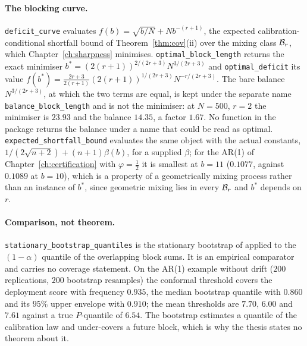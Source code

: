 \paragraph{The blocking curve.}
\texttt{deficit\_curve} evaluates $f(b)=\sqrt{b/N}+Nb^{-(r+1)}$, the expected calibration-conditional shortfall bound of Theorem~\ref{thm:cov}(ii) over the mixing class $\mathcal B_{r}$, which Chapter~\ref{ch:sharpness} minimises. \texttt{optimal\_block\_length} returns the exact minimiser $b^*=(2(r+1))^{2/(2r+3)}N^{3/(2r+3)}$ and \texttt{optimal\_deficit} its value $f(b^*)=\frac{2r+3}{2(r+1)}(2(r+1))^{1/(2r+3)}N^{-r/(2r+3)}$. The bare balance $N^{3/(2r+3)}$, at which the two terms are equal, is kept under the separate name \texttt{balance\_block\_length} and is not the minimiser: at $N=500$, $r=2$ the minimiser is $23.93$ and the balance $14.35$, a factor $1.67$. No function in the package returns the balance under a name that could be read as optimal. \texttt{expected\_shortfall\_bound} evaluates the same object with the actual constants, $1/(2\sqrt{n+2})+(n+1)\beta(b)$, for a supplied $\beta$; for the AR(1) of Chapter~\ref{ch:certification} with $\varphi=\tfrac12$ it is smallest at $b=11$ ($0.1077$, against $0.1089$ at $b=10$), which is a property of a geometrically mixing process rather than an instance of $b^*$, since geometric mixing lies in every $\mathcal B_{r}$ and $b^*$ depends on $r$.

\paragraph{Comparison, not theorem.}
\texttt{stationary\_bootstrap\_quantiles} is the stationary bootstrap of \citet{politis1994} applied to the $(1-\alpha)$ quantile of the overlapping block sums. It is an empirical comparator and carries no coverage statement. On the AR(1) example without drift ($200$ replications, $200$ bootstrap resamples) the conformal threshold covers the deployment score with frequency $0.935$, the median bootstrap quantile with $0.860$ and its $95\%$ upper envelope with $0.910$; the mean thresholds are $7.70$, $6.00$ and $7.61$ against a true $P$-quantile of $6.54$. The bootstrap estimates a quantile of the calibration law and under-covers a future block, which is why the thesis states no theorem about it.

